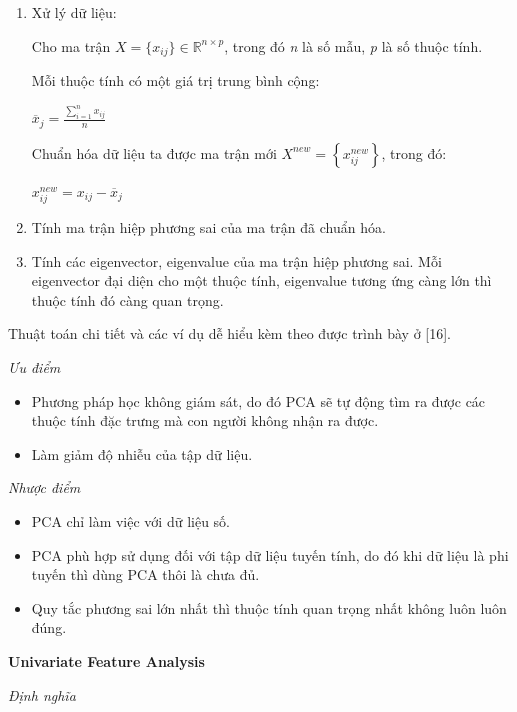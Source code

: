 \documentclass[12pt]{extarticle}
\begin{document}
				\begin{enumerate}
					\item Xử lý dữ liệu:
					\par Cho ma trận ${X= \big\{ x_{ij} \big\}  \in  \mathbb{R}^{n \times p}}$, trong đó \textit{n} là số mẫu, \textit{p} là số thuộc tính.
					\par Mỗi thuộc tính có một giá trị trung bình cộng:
					\begin{center}
						\par ${\overline{x}_{j}=\frac{\sum_{i=1}^n{x_{ij}}}{n}}$
					\end{center}
					\par Chuẩn hóa dữ liệu ta được ma trận mới ${X^{new}=\left\{x_{ij}^{new}\right\}}$, trong đó:
					\begin{center}
						\par ${x_{ij}^{new}=x_{ij}-\overline{x}_{j}}$
					\end{center}
					\item Tính ma trận hiệp phương sai của ma trận đã chuẩn hóa.
					\item Tính các eigenvector, eigenvalue của ma trận hiệp phương sai. Mỗi eigenvector đại diện cho một thuộc tính, eigenvalue tương ứng càng lớn thì thuộc tính đó càng quan trọng.
				\end{enumerate}
				\par Thuật toán chi tiết và các ví dụ dễ hiểu kèm theo được trình bày ở [16].
				\par  \textit{Ưu điểm}
				\begin{itemize}
					\item{Phương pháp học không giám sát, do đó PCA sẽ tự động tìm ra được các thuộc tính đặc trưng mà con người không nhận ra được.}
					\item{Làm giảm độ nhiễu của tập dữ liệu.}
				\end{itemize}
				\par  \textit{Nhược điểm}
				\begin{itemize}
					\item{PCA chỉ làm việc với dữ liệu số.}
					\item{PCA phù hợp sử dụng đối với tập dữ liệu tuyến tính, do đó khi dữ liệu là phi tuyến thì dùng PCA thôi là chưa đủ.}
					\item{Quy tắc phương sai lớn nhất thì thuộc tính quan trọng nhất không luôn luôn đúng.}
				\end{itemize}
			\par \textbf{Univariate Feature Analysis}
				\par \textit{Định nghĩa} 
\end{document}
